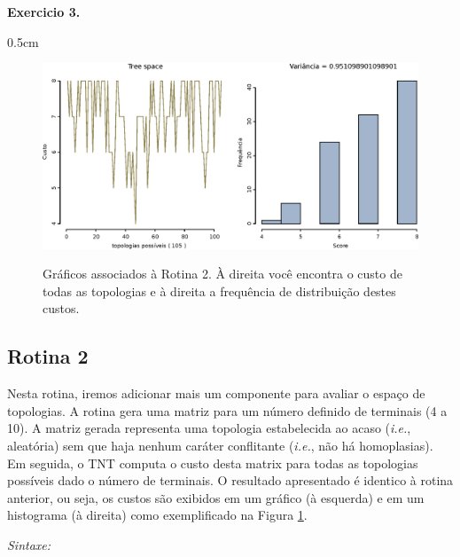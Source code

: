 \begin{refsection}
\begin{blackBlock}{\textbf{Exercicio 3.}}
\begin {myindentpar}{0.5cm}
\begin{enumerate}[\itshape i.]
\end{enumerate}
\end{myindentpar}

\end{blackBlock}


  \begin{figure}[H]
      {\includegraphics[scale=0.80]{figures/tut3/struc.eps}}
      {\caption[\textit{\textit{structured space} }]{Gráficos associados à Rotina 2. À direita você encontra o custo de todas as topologias e à direita a frequência de distribuição destes custos.}\label{tut3:fig:struc}}
  \end{figure}



\subsection{Rotina 2}\label{tut3:subs:struc}

	Nesta rotina, iremos adicionar mais um componente para avaliar o espaço de topologias. A rotina gera uma matriz para um número definido de terminais (4 a 10). A matriz gerada representa uma topologia estabelecida ao acaso (\textit{i.e.}, aleatória) sem que haja nenhum caráter conflitante (\textit{i.e.}, não há homoplasias). Em seguida, o TNT computa o custo desta matrix para todas as topologias possíveis dado o número de terminais. O resultado apresentado é identico à rotina anterior, ou seja, os custos são exibidos em um gráfico (à esquerda) e em um histograma (à direita) como exemplificado na Figura \ref{tut3:fig:struc}.

\indent\textit{Sintaxe:}\\
\indent\indent\indent{}\\


\end{refsection}
